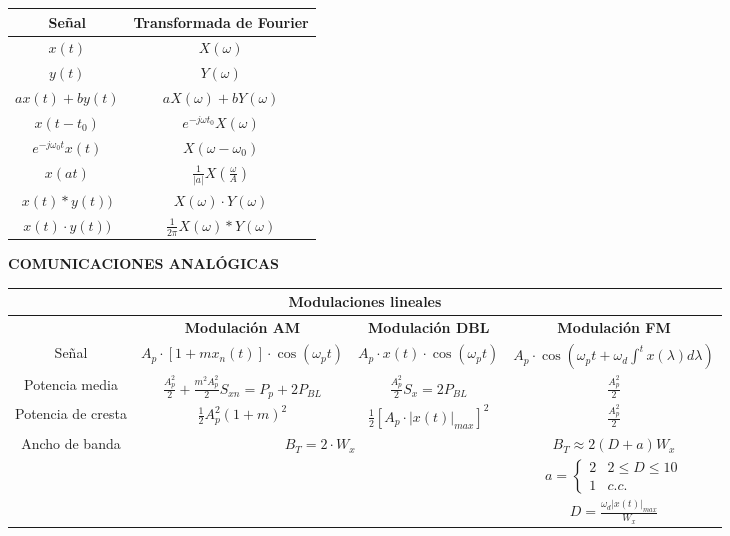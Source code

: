 \documentclass[es]{article}
\begin{document}
\begin{center}
\begin{tabular}{|c|c|}
        \hline
        {\bf Señal} & {\bf Transformada de Fourier} \\
        \hline
        $x(t)$ & $X(\omega)$ \\
        \hline
        $y(t)$ & $Y(\omega)$ \\
        \hline
        $a x(t) + b y(t) $ & $a X(\omega) + b Y(\omega)$ \\
        \hline
        $x(t-t_0)$ & $e^{-j \omega t_0} X(\omega)$ \\
        \hline
        $e^{-j\omega_0 t} x(t)$ & $X(\omega - \omega_0)$ \\
        \hline
        $x(at)$ & $\displaystyle\frac{1}{|a|}X \left ( \displaystyle\frac{\omega}{A} \right )$ \\
        \hline
        $x(t) \ast y(t))$ & $X(\omega) \cdot Y(\omega)$ \\
        \hline
        $x(t) \cdot y(t))$ & $\displaystyle\frac{1}{2\pi} X(\omega) \ast Y(\omega)$ \\
        \hline
    \end{tabular}
    \renewcommand{\arraystretch}{1}
    \vspace{0.5cm}

    \newpage

    {\bf COMUNICACIONES ANALÓGICAS}

    \renewcommand{\arraystretch}{2}
    \begin{tabular}{|c|c|c|c|}
        \multicolumn{4}{c}{{\bf Modulaciones lineales }} \\
        \hline
        & {\bf Modulación AM } & {\bf Modulación DBL} & {\bf Modulación FM} \\
        \hline
        Señal & $A_p \cdot [1 + m x_n(t)] \cdot \cos(\omega_p t)$ & $A_p \cdot x(t) \cdot \cos(\omega_p t)$ & $A_p \cdot \cos \left ( \omega_p t + \omega_d \int^t x(\lambda) d\lambda \right )$\\
        \hline
        Potencia media & $\displaystyle\frac{A_p^2}{2} + \displaystyle\frac{m^2 A_p^2}{2} S_{xn} = P_p + 2P_{BL}$ & $\displaystyle\frac{A_p^2}{2}S_x = 2 P_{BL}$ & $\frac{A_p^2}{2}$ \\
        \hline
        Potencia de cresta & $\displaystyle\frac{1}{2} A_p^2 (1+m)^2$ & $\displaystyle\frac{1}{2} [A_p \cdot |x(t)|_{max}]^2$ & $\frac{A_p^2}{2}$\\
        \hline
        \multirow{3}{*}{Ancho de banda} & \multicolumn{2}{c|}{$B_T = 2 \cdot W_x$} & $B_T \approx 2 (D+a) W_x$\\
        & \multicolumn{2}{c|}{} & $a = \left \{ \begin{array}{lc} 2 & 2 \leq D \leq 10 \\ 1 & c.c. \end{array} \right. $ \\
        & \multicolumn{2}{c|}{} & $D = \frac{\omega_d |x(t)|_{max}}{W_x}$ \\
        \hline
    \end{tabular}


\end{center}
\end{document}
